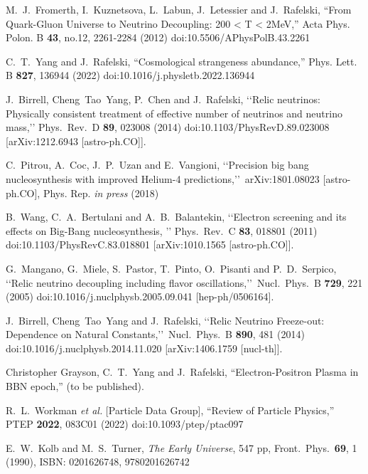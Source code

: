 \documentclass[Universe,article,submit,moreauthors,pdftex]{Definitions/mdpi}
\begin{document}
\begin{thebibliography}{99}

M.~J.~Fromerth, I.~Kuznetsova, L.~Labun, J.~Letessier and J.~Rafelski,
``From Quark-Gluon Universe to Neutrino Decoupling: 200 < T < 2MeV,''
Acta Phys. Polon. B \textbf{43}, no.12, 2261-2284 (2012)
doi:10.5506/APhysPolB.43.2261

C.~T.~Yang and J.~Rafelski,
``Cosmological strangeness abundance,''
Phys. Lett. B \textbf{827}, 136944 (2022)
doi:10.1016/j.physletb.2022.136944

J.~Birrell, Cheng~Tao~Yang, P.~Chen and J.~Rafelski,
\lq\lq Relic neutrinos: Physically consistent treatment of effective number of neutrinos and neutrino mass,\rq\rq
Phys.\ Rev.\ D {\bf 89}, 023008 (2014)
doi:10.1103/PhysRevD.89.023008
[arXiv:1212.6943 [astro-ph.CO]].


C.~Pitrou, A.~Coc, J.~P.~Uzan and E.~Vangioni,
\lq\lq Precision big bang nucleosynthesis with improved Helium-4 predictions,\rq\rq\ 
arXiv:1801.08023 [astro-ph.CO], Phys. Rep. {\it in press} (2018)

B.~Wang, C.~A.~Bertulani and A.~B.~Balantekin,
\lq\lq Electron screening and its effects on Big-Bang nucleosynthesis, \rq\rq
Phys.\ Rev.\ C {\bf 83}, 018801 (2011)
doi:10.1103/PhysRevC.83.018801
[arXiv:1010.1565 [astro-ph.CO]].

G.~Mangano, G.~Miele, S.~Pastor, T.~Pinto, O.~Pisanti and P.~D.~Serpico,
\lq\lq Relic neutrino decoupling including flavor oscillations,\rq\rq\
Nucl.\ Phys.\ B {\bf 729}, 221 (2005)
doi:10.1016/j.nuclphysb.2005.09.041
[hep-ph/0506164].

 J.~Birrell, Cheng~Tao~Yang and J.~Rafelski,
\lq\lq Relic Neutrino Freeze-out: Dependence on Natural Constants,\rq\rq\
 Nucl.\ Phys.\ B {\bf 890}, 481 (2014)
 doi:10.1016/j.nuclphysb.2014.11.020
 [arXiv:1406.1759 [nucl-th]].

\bibitem{Chris:2023abc}
Christopher Grayson, C.~T.~Yang and J.~Rafelski,
``Electron-Positron Plasma in BBN epoch,'' (to be published).


R.~L.~Workman \textit{et al.} [Particle Data Group],
``Review of Particle Physics,''
PTEP \textbf{2022}, 083C01 (2022)
doi:10.1093/ptep/ptac097

E.~W.~Kolb and M.~S.~Turner,
\emph{The Early Universe},
547 pp, Front.\ Phys.\ {\bf 69}, 1 (1990),
ISBN: 0201626748, 9780201626742


 


\end{thebibliography}

\end{document}
